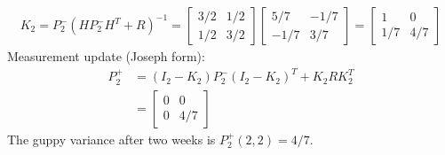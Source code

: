 \documentclass[12pt]{article}
\begin{document}
\begin{stepbox}
\begin{align}
K_2 = P_2^- (H P_2^- H^T + R)^{-1} = \begin{bmatrix} 3/2 & 1/2 \\ 1/2 & 3/2 \end{bmatrix}\begin{bmatrix} 5/7 & -1/7 \\ -1/7 & 3/7 \end{bmatrix} = \begin{bmatrix} 1 & 0 \\ 1/7 & 4/7 \end{bmatrix}
\end{align}
Measurement update (Joseph form):
\begin{align}
P_2^+ &= (I_2 - K_2)P_2^-(I_2 - K_2)^T + K_2 R K_2^T \nonumber \\
&= \begin{bmatrix} 0 & 0 \\ 0 & 4/7 \end{bmatrix}
\end{align}
The guppy variance after two weeks is $P_2^+(2,2) = \boxed{4/7}$.

\end{stepbox}
\end{document}
